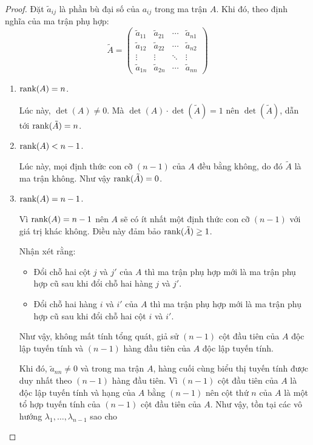 \documentclass[class=nhvh-linear-algebra,crop=false]{standalone}
\begin{document}
\begin{proof}
	\par Đặt $\tilde{a}_{ij}$ là phần bù đại số của $a_{ij}$ trong ma trận $A$. Khi đó, theo định nghĩa của ma trận phụ hợp:
	\[
		\tilde{A} =
		\begin{pmatrix}
			\tilde{a}_{11} & \tilde{a}_{21} & \cdots & \tilde{a}_{n1} \\
			\tilde{a}_{12} & \tilde{a}_{22} & \cdots & \tilde{a}_{n2} \\
			\vdots         & \vdots         & \ddots & \vdots         \\
			\tilde{a}_{1n} & \tilde{a}_{2n} & \cdots & \tilde{a}_{nn}
		\end{pmatrix}
	\]
	\begin{enumerate}[label = \textbf{Trường hợp \arabic*.},itemindent=2cm]
		\item $\text{rank}(A) = n$.
		      \par Lúc này, $\det(A)\ne 0$. Mà $\det(A)\cdot\det(\tilde{A}) = 1$ nên $\det(\tilde{A})$, dẫn tới $\text{rank}(\tilde{A}) = n$.
		\item $\text{rank}(A) < n - 1$.
		      \par Lúc này, mọi định thức con cỡ $(n-1)$ của $A$ đều bằng không, do đó $\tilde{A}$ là ma trận không. Như vậy $\text{rank}(\tilde{A}) = 0$.
		\item $\text{rank}(A) = n - 1$.
		      \par Vì $\text{rank}(A) = n - 1$ nên $A$ sẽ có ít nhất một định thức con cỡ $(n-1)$ với giá trị khác không. Điều này đảm bảo $\text{rank}(\tilde{A})\ge 1$.
		      \par Nhận xét rằng:
		      \begin{itemize}
			      \item Đổi chỗ hai cột $j$ và $j'$ của $A$ thì ma trận phụ hợp mới là ma trận phụ hợp cũ sau khi đổi chỗ hai hàng $j$ và $j'$.
			      \item Đổi chỗ hai hàng $i$ và $i'$ của $A$ thì ma trận phụ hợp mới là ma trận phụ hợp cũ sau khi đổi chỗ hai cột $i$ và $i'$.
		      \end{itemize}
		      \par Như vậy, không mất tính tổng quát, giả sử $(n-1)$ cột đầu tiên của $A$ độc lập tuyến tính và $(n-1)$ hàng đầu tiên của $A$ độc lập tuyến tính.
		      \par Khi đó, $\tilde{a}_{nn}\ne 0$ và trong ma trận $A$, hàng cuối cùng biểu thị tuyến tính được duy nhất theo $(n-1)$ hàng đầu tiên.
		      Vì $(n-1)$ cột đầu tiên của $A$ là độc lập tuyến tính và hạng của $A$ bằng $(n-1)$ nên cột thứ $n$ của $A$ là một tổ hợp tuyến tính của $(n-1)$ cột đầu tiên của $A$. Như vậy, tồn tại các vô hướng $\lambda_{1}, \ldots, \lambda_{n-1}$ sao cho


\end{enumerate}
\end{proof}
\end{document}
